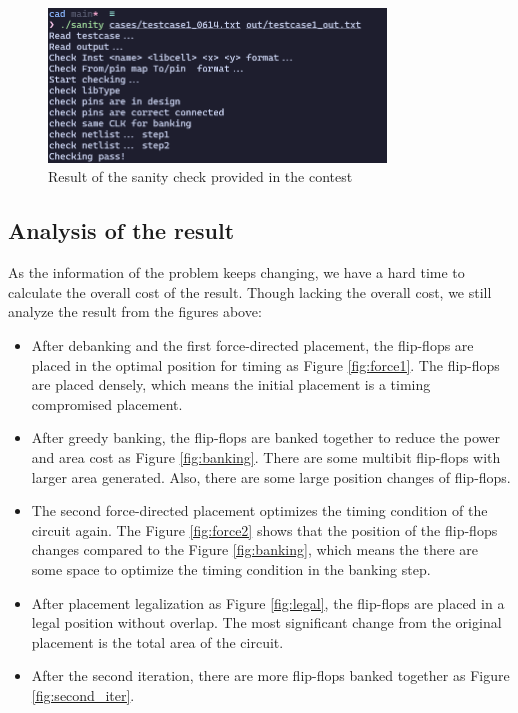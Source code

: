 \documentclass[12pt]{article}
\begin{document}
\begin{figure}[htbp]
    \centering
    \includegraphics[width=0.8\textwidth]{results/sanity.png}
    \caption{Result of the sanity check provided in the contest}
    \label{fig:sanity}
\end{figure}

\FloatBarrier

\subsection{Analysis of the result}

As the information of the problem keeps changing, we have a hard time to calculate the overall cost of the result. Though lacking the overall cost, we still analyze the result from the figures above:

\begin{itemize}
    \item After debanking and the first force-directed placement, the flip-flops are placed in the optimal position for timing as Figure \ref{fig:force1}. The flip-flops are placed densely, which means the initial placement is a timing compromised placement.
    \item After greedy banking, the flip-flops are banked together to reduce the power and area cost as Figure \ref{fig:banking}. There are some multibit flip-flops with larger area generated. Also, there are some large position changes of flip-flops.
    \item The second force-directed placement optimizes the timing condition of the circuit again. The Figure \ref{fig:force2} shows that the position of the flip-flops changes compared to the Figure \ref{fig:banking}, which means the there are some space to optimize the timing condition in the banking step.
    \item After placement legalization as Figure \ref{fig:legal}, the flip-flops are placed in a legal position without overlap. The most significant change from the original placement is the total area of the circuit.
    \item After the second iteration, there are more flip-flops banked together as Figure \ref{fig:second_iter}.
\end{itemize}
\end{document}
